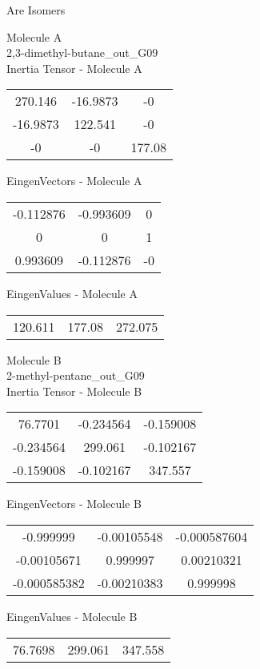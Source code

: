\begin{center}
\vtab
\vtab
\textcolor{NavyBlue}{\Large Are Isomers}
\end{center}
\newpage
\begin{multicols}{2}
\begin{center}
Molecule A \\ 
2,3-dimethyl-butane\_out\_G09
\\
Inertia Tensor - Molecule A \\
\vtab
\begin{tabular}{|c c c|}
270.146	 & 	-16.9873	 & 	-0	 \\
-16.9873	 & 	122.541	 & 	-0	 \\
-0	 & 	-0	 & 	177.08
\end{tabular}

\vtab
 EingenVectors - Molecule A     \\
\vtab
\begin{tabular}{|c c c|}
-0.112876	 & 	-0.993609	 & 	0	 \\
0	 & 	0	 & 	1	 \\
0.993609	 & 	-0.112876	 & 	-0
\end{tabular}

\vtab
 EingenValues - Molecule A     \\
\vtab
\begin{tabular}{|c c c|}
120.611	 & 	177.08	 & 	272.075
\end{tabular}
\columnbreak

Molecule B \\ 
2-methyl-pentane\_out\_G09
\\
Inertia Tensor - Molecule B \\
\vtab
\begin{tabular}{|c c c|}
76.7701	 & 	-0.234564	 & 	-0.159008	 \\
-0.234564	 & 	299.061	 & 	-0.102167	 \\
-0.159008	 & 	-0.102167	 & 	347.557
\end{tabular}

\vtab
 EingenVectors - Molecule B     \\
\vtab
\begin{tabular}{|c c c|}
-0.999999	 & 	-0.00105548	 & 	-0.000587604	 \\
-0.00105671	 & 	0.999997	 & 	0.00210321	 \\
-0.000585382	 & 	-0.00210383	 & 	0.999998
\end{tabular}

\vtab
 EingenValues - Molecule B     \\
\vtab
\begin{tabular}{|c c c|}
76.7698	 & 	299.061	 & 	347.558
\end{tabular}

\end{center}
\end{multicols}
